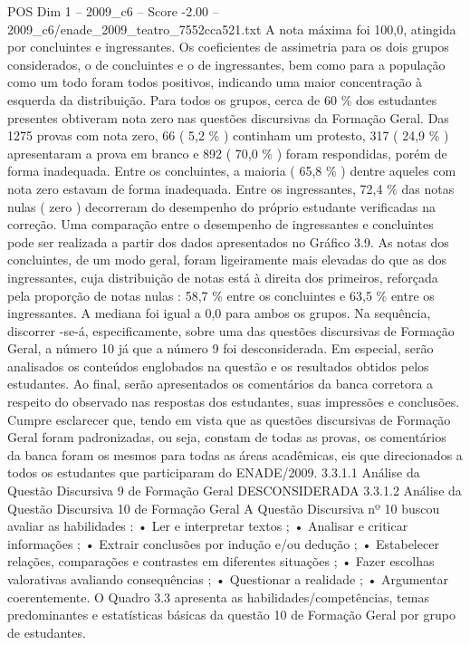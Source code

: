 \begin{textsample}{POS Dim 1 – 2009\_c6 – Score -2.00 – 2009\_c6/enade\_2009\_teatro\_7552cca521.txt}
A nota máxima foi 100,0, atingida por concluintes e ingressantes.
Os coeficientes de assimetria para os dois grupos considerados, o de concluintes e o de ingressantes, bem como para a população como um todo foram todos positivos, indicando uma maior concentração à esquerda da distribuição.
Para todos os grupos, cerca de 60 \% dos estudantes presentes obtiveram nota zero nas questões discursivas da Formação Geral.
Das 1275 provas com nota zero, 66 ( 5,2 \% ) continham um protesto, 317 ( 24,9 \% ) apresentaram a prova em branco e 892 ( 70,0 \% ) foram respondidas, porém de forma inadequada.
Entre os concluintes, a maioria ( 65,8 \% ) dentre aqueles com nota zero estavam de forma inadequada.
Entre os ingressantes, 72,4 \% das notas nulas ( zero ) decorreram do desempenho do próprio estudante verificadas na correção.
Uma comparação entre o desempenho de ingressantes e concluintes pode ser realizada a partir dos dados apresentados no Gráfico 3.9.
As notas dos concluintes, de um modo geral, foram ligeiramente mais elevadas do que as dos ingressantes, cuja distribuição de notas está à direita dos primeiros, reforçada pela proporção de notas nulas : 58,7 \% entre os concluintes e 63,5 \% entre os ingressantes.
A mediana foi igual a 0,0 para ambos os grupos.
Na sequência, discorrer -se-á, especificamente, sobre uma das questões discursivas de Formação Geral, a número 10 já que a número 9 foi desconsiderada.
Em especial, serão analisados os conteúdos englobados na questão e os resultados obtidos pelos estudantes.
Ao final, serão apresentados os comentários da banca corretora a respeito do observado nas respostas dos estudantes, suas impressões e conclusões.
Cumpre esclarecer que, tendo em vista que as questões discursivas de Formação Geral foram padronizadas, ou seja, constam de todas as provas, os comentários da banca foram os mesmos para todas as áreas acadêmicas, eis que direcionados a todos os estudantes que participaram do ENADE/2009. 3.3.1.1 Análise da Questão Discursiva 9 de Formação Geral DESCONSIDERADA 3.3.1.2 Análise da Questão Discursiva 10 de Formação Geral A Questão Discursiva nº 10 buscou avaliar as habilidades : • Ler e interpretar textos ; • Analisar e criticar informações ; • Extrair conclusões por indução e/ou dedução ; • Estabelecer relações, comparações e contrastes em diferentes situações ; • Fazer escolhas valorativas avaliando consequências ; • Questionar a realidade ; • Argumentar coerentemente.
O Quadro 3.3 apresenta as habilidades/competências, temas predominantes e estatísticas básicas da questão 10 de Formação Geral por grupo de estudantes.

\end{textsample}

